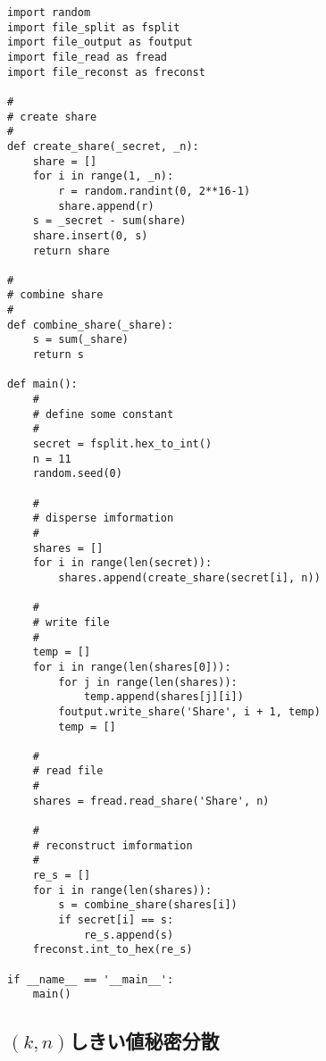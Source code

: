 \documentclass[10pt, a4paper, titlepage]{jsreport}
\begin{document}
	\begin{lstlisting}[caption=AdditiveSecretSharing.py, label=ASS]
import random
import file_split as fsplit
import file_output as foutput
import file_read as fread
import file_reconst as freconst

#
# create share
#
def create_share(_secret, _n):
    share = []
    for i in range(1, _n):
        r = random.randint(0, 2**16-1)
        share.append(r)
    s = _secret - sum(share)
    share.insert(0, s)
    return share

#
# combine share
#
def combine_share(_share):
    s = sum(_share)
    return s

def main():
    #
    # define some constant
    #
    secret = fsplit.hex_to_int()
    n = 11
    random.seed(0)

    #
    # disperse imformation
    #
    shares = []
    for i in range(len(secret)):
        shares.append(create_share(secret[i], n))

    #
    # write file
    #
    temp = []
    for i in range(len(shares[0])):
        for j in range(len(shares)):
            temp.append(shares[j][i])
        foutput.write_share('Share', i + 1, temp)
        temp = []

    #
    # read file
    #
    shares = fread.read_share('Share', n)

    #
    # reconstruct imformation
    #
    re_s = []
    for i in range(len(shares)):
        s = combine_share(shares[i])
        if secret[i] == s:
            re_s.append(s)
    freconst.int_to_hex(re_s)

if __name__ == '__main__':
    main()
	\end{lstlisting}

	\subsection{$(k,n)$しきい値秘密分散}
\end{document}
